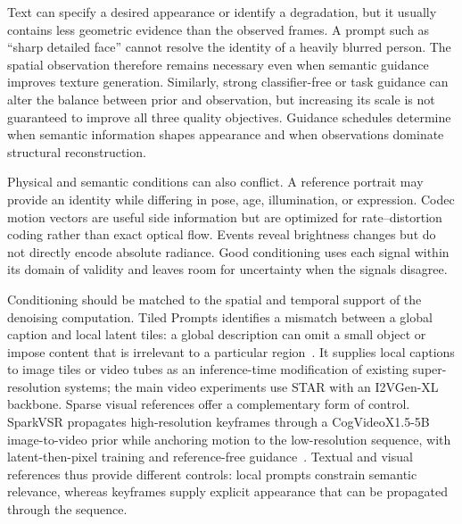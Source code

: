Text can specify a desired appearance or identify a degradation, but it usually contains less geometric evidence than the observed frames. A prompt such as ``sharp detailed face'' cannot resolve the identity of a heavily blurred person. The spatial observation therefore remains necessary even when semantic guidance improves texture generation. Similarly, strong classifier-free or task guidance can alter the balance between prior and observation, but increasing its scale is not guaranteed to improve all three quality objectives. Guidance schedules determine when semantic information shapes appearance and when observations dominate structural reconstruction.

Physical and semantic conditions can also conflict. A reference portrait may provide an identity while differing in pose, age, illumination, or expression. Codec motion vectors are useful side information but are optimized for rate--distortion coding rather than exact optical flow. Events reveal brightness changes but do not directly encode absolute radiance. Good conditioning uses each signal within its domain of validity and leaves room for uncertainty when the signals disagree.

Conditioning should be matched to the spatial and temporal support of the denoising computation. Tiled Prompts identifies a mismatch between a global caption and local latent tiles: a global description can omit a small object or impose content that is irrelevant to a particular region~\cite{tiledprompts}. It supplies local captions to image tiles or video tubes as an inference-time modification of existing super-resolution systems; the main video experiments use STAR with an I2VGen-XL backbone. Sparse visual references offer a complementary form of control. SparkVSR propagates high-resolution keyframes through a CogVideoX1.5-5B image-to-video prior while anchoring motion to the low-resolution sequence, with latent-then-pixel training and reference-free guidance~\cite{sparkvsr}. Textual and visual references thus provide different controls: local prompts constrain semantic relevance, whereas keyframes supply explicit appearance that can be propagated through the sequence.
